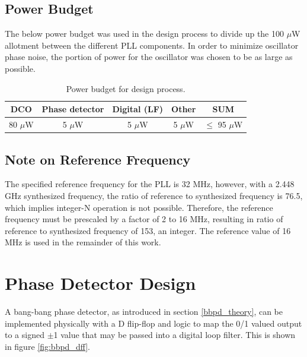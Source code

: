 	\subsection{Power Budget}
	The below power budget was used in the design process to divide up the 100 $\mu$W allotment between the different PLL components. In order to minimize oscillator phase noise, the portion of power for the oscillator was chosen to be as large as possible.
		\begin{table}[htb!]
			\centering
			\def\arraystretch{1.5}		
			\setlength\arrayrulewidth{0.75pt}
			\setlength{\tabcolsep}{1em} %
			\begin{tabular}{|c|c|c|c|c|}
				\hline 
				\rule[-1ex]{0pt}{2.5ex} \cellcolor{gray!40}\textbf{DCO} & \cellcolor{gray!40}\textbf{Phase detector} & \cellcolor{gray!40}\textbf{Digital (LF)}& \cellcolor{gray!40}\textbf{Other} & \cellcolor{gray!40}\textbf{SUM} \\ 
				\hline 
				\rule[-1ex]{0pt}{2.5ex} 80 $\mu$W& 5 $\mu$W &  5 $\mu$W  & 5 $ \mu$W & $\leq$ 95  $\mu$W\\ 
				\hline 
			\end{tabular} 
			\caption{Power budget for design process.}
			\label{tab:pow_budget}
		\end{table}   

	\FloatBarrier
	\subsection{Note on Reference Frequency}
	The specified reference frequency for the PLL is 32 MHz, however, with a 2.448 GHz synthesized frequency, the ratio of reference to synthesized frequency is 76.5, which implies integer-N operation is not possible. Therefore, the reference frequency must be prescaled by a factor of 2 to 16 MHz, resulting in ratio of reference to synthesized frequency of 153, an integer. The reference value of 16 MHz is used in the remainder of this work.


\FloatBarrier\pagebreak
\section{Phase Detector Design}\label{sec:pd_design}

		A bang-bang phase detector, as introduced in section \ref{bbpd_theory}, can be implemented physically with a D flip-flop \cite{Razavi2020} and logic to map the 0/1 valued output to a signed $\pm$1 value that may be passed into a digital loop filter. This is shown in figure \ref{fig:bbpd_dff}. 

